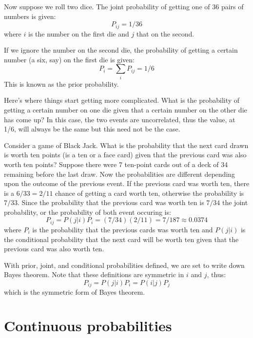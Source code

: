 \documentclass{article}
\begin{document}
Now suppose we roll two dice. 
The joint probability of getting one of 36 pairs of numbers is given:
\begin{equation}
	P_{ij} = 1/36
\end{equation}
where $i$ is the number on the first die and $j$ that on the second.

If we ignore the number on the second die, the probability of getting a
certain number (a six, say) on the first die is given:
\begin{equation}
	P_i = \sum_i P_{ij} = 1/6
	\label{prior_prob}
\end{equation}
This is known as the prior probability.

Here's where things start getting more complicated.
What is the probability of getting a certain number on one die given that
 a certain number on the other die has come up?
In this case, the two events are uncorrelated, thus the value, at 1/6, will
always be the same but this need not be the case.

Consider a game of Black Jack.
What is the probability that the next card drawn is worth ten points (is a ten
or a face card) given that the previous card was also worth ten points?
Suppose there were 7 ten-point cards out of a deck of 34 remaining before
the last draw.
Now the probabilities are different depending upon the outcome of the previous
event.
If the previous card was worth ten, there is a $6/33=2/11$ chance of getting a card
worth ten, otherwise the probability is $7/33$.
Since the probability that the previous card was worth ten is $7/34$
the joint probability, or the probability of both event occuring is:
\begin{equation}
	P_{ij} = P(j | i) P_i = (7/34)(2/11) = 7/187 \approx 0.0374
	\label{joint_prob}
\end{equation}
where $P_i$ is the probability that the previous cards was worth ten and
$P(j|i)$ is the conditional probability that the next card will be worth ten
given that the previous card was also worth ten.

With prior, joint, and conditional probabilities defined, we are set to write
down Bayes theorem.
Note that these definitions are symmetric in $i$ and $j$, thus:
\begin{equation}
	P_{ij} = P(j|i) P_i = P(i|j) P_j
	\label{Bayes_thm}
\end{equation}
which is the symmetric form of Bayes theorem.

\section{Continuous probabilities}
\end{document}
